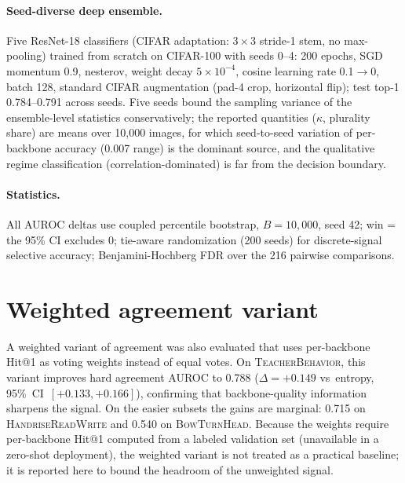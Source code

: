 \documentclass[a4paper,fleqn]{cas-sc}
\newcommand{\tb}{\textsc{TeacherBehavior}}
\newcommand{\hrw}{\textsc{HandriseReadWrite}}
\newcommand{\bth}{\textsc{BowTurnHead}}
\begin{document}
\paragraph{Seed-diverse deep ensemble.}
Five ResNet-18 classifiers (CIFAR adaptation: $3\times3$ stride-1 stem, no max-pooling) trained from scratch on CIFAR-100 with seeds 0--4: 200 epochs, SGD momentum 0.9, nesterov, weight decay $5\times10^{-4}$, cosine learning rate 0.1$\rightarrow$0, batch 128, standard CIFAR augmentation (pad-4 crop, horizontal flip); test top-1 0.784--0.791 across seeds.
Five seeds bound the sampling variance of the ensemble-level statistics conservatively; the reported quantities ($\kappa$, plurality share) are means over 10,000 images, for which seed-to-seed variation of per-backbone accuracy (0.007 range) is the dominant source, and the qualitative regime classification (correlation-dominated) is far from the decision boundary.

\paragraph{Statistics.}
All AUROC deltas use coupled percentile bootstrap, $B{=}10{,}000$, seed 42; win = the 95\% CI excludes 0; tie-aware randomization (200 seeds) for discrete-signal selective accuracy; Benjamini-Hochberg FDR over the 216 pairwise comparisons.

\section{Weighted agreement variant}
\label{sec:weighted}

A weighted variant of agreement was also evaluated that uses per-backbone Hit@1 as voting weights instead of equal votes.
On \tb{}, this variant improves hard agreement AUROC to 0.788 ($\Delta = +0.149$ vs~entropy, 95\%~CI~$[+0.133,+0.166]$), confirming that backbone-quality information sharpens the signal.
On the easier subsets the gains are marginal: 0.715 on \hrw{} and 0.540 on \bth{}.
Because the weights require per-backbone Hit@1 computed from a labeled validation set (unavailable in a zero-shot deployment), the weighted variant is not treated as a practical baseline; it is reported here to bound the headroom of the unweighted signal.
\end{document}
